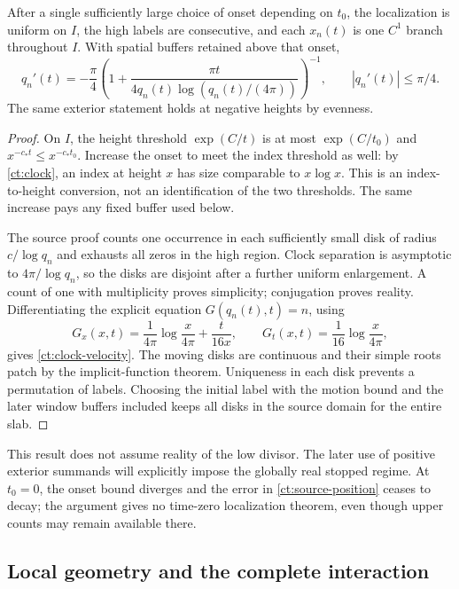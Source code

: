 \begin{lemma}
\label{ct:labels}
After a single sufficiently large choice of onset depending on $t_0$,
the localization is uniform on $I$, the high labels are consecutive,
and each $x_n(t)$ is one $C^1$ branch throughout $I$. With spatial
buffers retained above that onset,
\begin{equation}
 q_n'(t)=-\frac{\pi}{4}
       \left(1+\frac{\pi t}{4q_n(t)\log(q_n(t)/(4\pi))}\right)^{-1},
 \qquad |q_n'(t)|\le\pi/4.
 \label{ct:clock-velocity}
\end{equation}
The same exterior statement holds at negative heights by evenness.
\end{lemma}

\begin{proof}
On $I$, the height threshold $\exp(C/t)$ is at most
$\exp(C/t_0)$ and $x^{-c_*t}\le x^{-c_*t_0}$. Increase the onset
to meet the index threshold as well: by \eqref{ct:clock}, an index at
height $x$ has size comparable to $x\log x$. This is an index-to-height
conversion, not an identification of the two thresholds. The same
increase pays any fixed buffer used below.

The source proof counts one occurrence in each sufficiently small disk
of radius $c/\log q_n$ and exhausts all zeros in the high region.
Clock separation is asymptotic to $4\pi/\log q_n$, so the disks are
disjoint after a further uniform enlargement. A count of one with
multiplicity proves simplicity; conjugation proves reality. Differentiating
the explicit equation $G(q_n(t),t)=n$, using
\[
 G_x(x,t)=\frac1{4\pi}\log\frac{x}{4\pi}+\frac{t}{16x},
 \qquad G_t(x,t)=\frac1{16}\log\frac{x}{4\pi},
\]
gives \eqref{ct:clock-velocity}. The moving disks are continuous and
their simple roots patch by the implicit-function theorem. Uniqueness
in each disk prevents a permutation of labels. Choosing the initial
label with the motion bound and the later window buffers included keeps
all disks in the source domain for the entire slab.
\end{proof}

This result does not assume reality of the low divisor. The later use
of positive exterior summands will explicitly impose the globally real
stopped regime. At $t_0=0$, the onset bound diverges and the error in
\eqref{ct:source-position} ceases to decay; the argument gives no
time-zero localization theorem, even though upper counts may remain
available there.

\subsection{Local geometry and the complete interaction}

